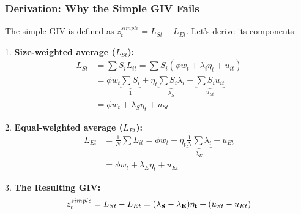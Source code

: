 \documentclass[aspectratio=169,11pt]{beamer}
\begin{document}
\begin{frame} \label{app_simple_giv_fails}
    \frametitle{Derivation: Why the Simple GIV Fails}
    The simple GIV is defined as $z_t^{simple} = L_{St} - L_{Et}$. Let's derive its components:

    1. \textbf{Size-weighted average ($L_{St}$):}
    \begin{align*}
        L_{St} & = \sum S_i L_{it} = \sum S_i (\phi w_t + \lambda_i \eta_t + u_{it})                                                               \\
               & = \phi w_t \underbrace{\sum S_i}_{1} + \eta_t \underbrace{\sum S_i \lambda_i}_{\lambda_S} + \underbrace{\sum S_i u_{it}}_{u_{St}} \\
               & = \phi w_t + \lambda_S \eta_t + u_{St}
    \end{align*}

    2. \textbf{Equal-weighted average ($L_{Et}$):}
    \begin{align*}
        L_{Et} & = \frac{1}{N} \sum L_{it} = \phi w_t + \eta_t \underbrace{\frac{1}{N} \sum \lambda_i}_{\lambda_E} + u_{Et} \\
               & = \phi w_t + \lambda_E \eta_t + u_{Et}
    \end{align*}

    3. \textbf{The Resulting GIV:} \hyperlink{src_simple_giv_fails}{}
    \begin{equation}
        z_t^{simple} = L_{St} - L_{Et} = \mathbf{(\lambda_S - \lambda_E) \eta_t} + (u_{St} - u_{Et}) \notag
    \end{equation}

    \vspace{0.1cm}
    \hfill \hyperlink{src_simple_giv_fails}{}
\end{frame}
\end{document}
